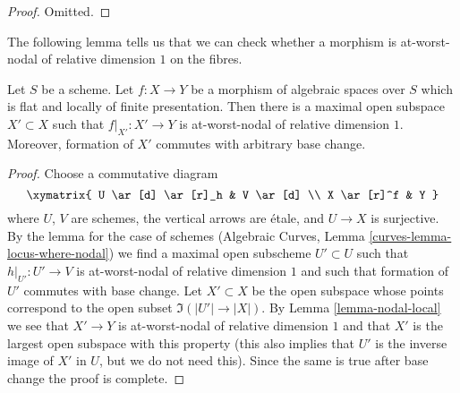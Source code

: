 \begin{proof}
Omitted.
\end{proof}

\noindent
The following lemma tells us that we can check whether a morphism
is at-worst-nodal of relative dimension $1$ on the fibres.

\begin{lemma}
\label{lemma-locus-where-nodal}
Let $S$ be a scheme.
Let $f : X \to Y$ be a morphism of algebraic spaces over $S$
which is flat and locally of finite presentation. Then there
is a maximal open subspace $X' \subset X$ such that $f|_{X'} : X' \to Y$
is at-worst-nodal of relative dimension $1$. Moreover, formation
of $X'$ commutes with arbitrary base change.
\end{lemma}

\begin{proof}
Choose a commutative diagram
$$
\xymatrix{
U \ar[d] \ar[r]_h & V \ar[d] \\
X \ar[r]^f & Y
}
$$
where $U$, $V$ are schemes, the vertical arrows are \'etale, and
$U \to X$ is surjective. By the lemma for the case of schemes
(Algebraic Curves, Lemma \ref{curves-lemma-locus-where-nodal})
we find a maximal open subscheme $U' \subset U$
such that $h|_{U'} : U' \to V$ is at-worst-nodal of relative dimension $1$
and such that formation of $U'$ commutes with base change.
Let $X' \subset X$ be the open subspace whose points correspond
to the open subset $\Im(|U'| \to |X|)$.
By Lemma \ref{lemma-nodal-local} we see that $X' \to Y$ is
at-worst-nodal of relative dimension $1$ and that $X'$ is the
largest open subspace with this property (this also implies
that $U'$ is the inverse image of $X'$ in $U$, but we do
not need this). Since the same is true after base change
the proof is complete.
\end{proof}













